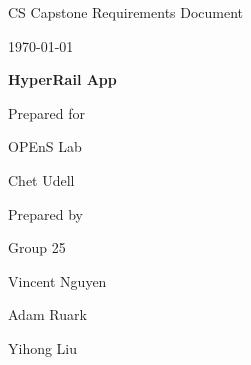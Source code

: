 \documentclass[onecolumn, draftclsnofoot,10pt, compsoc]{IEEEtran}
\def \CapstoneTeamName{		    Team 25}
\def \CapstoneTeamNumber{		25}
\def \GroupMemberOne{			Vincent Nguyen}
\def \GroupMemberTwo{			Adam Ruark}
\def \GroupMemberThree{			Yihong Liu}
\def \CapstoneProjectName{		HyperRail App}
\def \CapstoneSponsorCompany{	OPEnS Lab}
\def \CapstoneSponsorPerson{	Chet Udell}
\def \DocType{	%
				Requirements Document
				}
\newcommand{\NameSigPair}[1]{\par
\makebox[2.75in][r]{#1} \hfil 	\makebox[3.25in]{\makebox[2.25in]{\hrulefill} \hfill		\makebox[.75in]{\hrulefill}}
\par\vspace{-12pt} \textit{\tiny\noindent
\makebox[2.75in]{} \hfil		\makebox[3.25in]{\makebox[2.25in][r]{Signature} \hfill	\makebox[.75in][r]{Date}}}}
\renewcommand{\NameSigPair}[1]{#1}
\begin{document}
\begin{titlepage}
    \begin{singlespace}
        \hfill 
        \par\vspace{.2in}
        \centering
        \scshape{
            \huge CS Capstone \DocType \par
            {\large\today}\par
            \vspace{.5in}
            \textbf{\Huge\CapstoneProjectName}\par
            \vfill
            {\large Prepared for}\par
            \Huge \CapstoneSponsorCompany\par
            \vspace{5pt}
            {\Large\NameSigPair{\CapstoneSponsorPerson}\par}
            {\large Prepared by }\par
            Group\CapstoneTeamNumber\par
            \vspace{5pt}
            {\Large
                \NameSigPair{\GroupMemberOne}\par
                \NameSigPair{\GroupMemberTwo}\par
                \NameSigPair{\GroupMemberThree}\par
            }
            \vspace{20pt}
        }
        \begin{abstract}
        
        
        \end{abstract}     
    \end{singlespace}
\end{titlepage}
\newpage
{}
\tableofcontents

\clearpage

\end{document}
